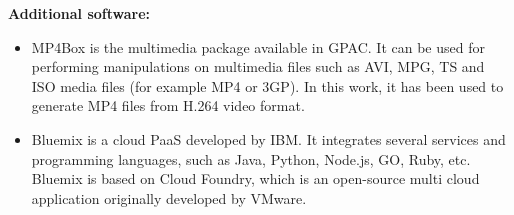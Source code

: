 \textbf{Additional software:}
\begin{itemize}
	\item {} MP4Box is the multimedia package available in GPAC. It can be used for performing manipulations on multimedia files such as AVI, MPG, TS and ISO media files (for example MP4 or 3GP). In this work, it has been used to generate MP4 files from H.264 video format.
	
	\item {} Bluemix is a cloud \ac{PaaS} developed by IBM. It integrates several services and programming languages, such as Java, Python, Node.js, GO, Ruby, etc. Bluemix is based on Cloud Foundry, which is an open-source multi cloud application originally developed by VMware.
	
\end{itemize}
